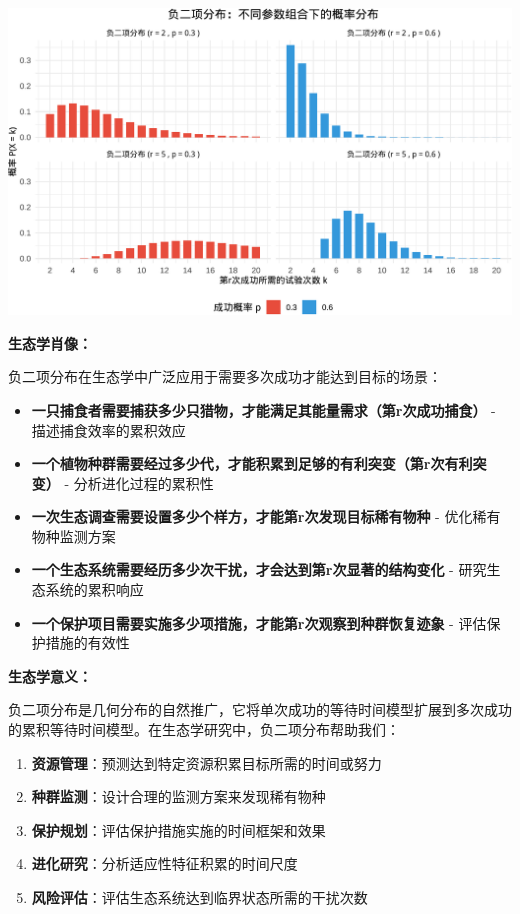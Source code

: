 \documentclass[
]{book}
\providecommand{\tightlist}{%
  \setlength{\itemsep}{0pt}\setlength{\parskip}{0pt}}
\begin{document}
\begin{center}\includegraphics[width=0.8\linewidth]{ecological-statistics_files/figure-latex/unnamed-chunk-25-1} \end{center}

\textbf{生态学肖像：}

负二项分布在生态学中广泛应用于需要多次成功才能达到目标的场景：

\begin{itemize}
\tightlist
\item
  \textbf{一只捕食者需要捕获多少只猎物，才能满足其能量需求（第r次成功捕食）} - 描述捕食效率的累积效应
\item
  \textbf{一个植物种群需要经过多少代，才能积累到足够的有利突变（第r次有利突变）} - 分析进化过程的累积性
\item
  \textbf{一次生态调查需要设置多少个样方，才能第r次发现目标稀有物种} - 优化稀有物种监测方案
\item
  \textbf{一个生态系统需要经历多少次干扰，才会达到第r次显著的结构变化} - 研究生态系统的累积响应
\item
  \textbf{一个保护项目需要实施多少项措施，才能第r次观察到种群恢复迹象} - 评估保护措施的有效性
\end{itemize}

\textbf{生态学意义：}

负二项分布是几何分布的自然推广，它将单次成功的等待时间模型扩展到多次成功的累积等待时间模型。在生态学研究中，负二项分布帮助我们：

\begin{enumerate}
\def\labelenumi{\arabic{enumi}.}
\tightlist
\item
  \textbf{资源管理}：预测达到特定资源积累目标所需的时间或努力
\item
  \textbf{种群监测}：设计合理的监测方案来发现稀有物种
\item
  \textbf{保护规划}：评估保护措施实施的时间框架和效果
\item
  \textbf{进化研究}：分析适应性特征积累的时间尺度
\item
  \textbf{风险评估}：评估生态系统达到临界状态所需的干扰次数
\end{enumerate}
\end{document}
